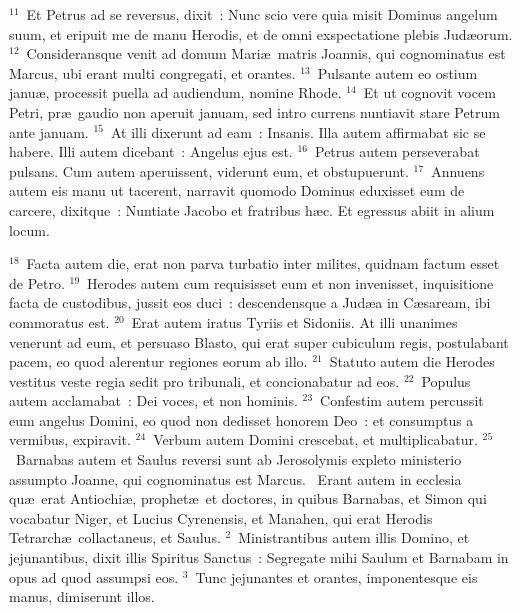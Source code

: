 ${}^{11}$~Et Petrus ad se reversus, dixit~: Nunc scio vere quia misit Dominus angelum suum, et eripuit me de manu Herodis, et de omni exspectatione plebis Jud\ae orum.
${}^{12}$~Consideransque venit ad domum Mari\ae\ matris Joannis, qui cognominatus est Marcus, ubi erant multi congregati, et orantes.
${}^{13}$~Pulsante autem eo ostium janu\ae , processit puella ad audiendum, nomine Rhode.
${}^{14}$~Et ut cognovit vocem Petri, pr\ae\ gaudio non aperuit januam, sed intro currens nuntiavit stare Petrum ante januam.
${}^{15}$~At illi dixerunt ad eam~: Insanis. Illa autem affirmabat sic se habere. Illi autem dicebant~: Angelus ejus est.
${}^{16}$~Petrus autem perseverabat pulsans. Cum autem aperuissent, viderunt eum, et obstupuerunt.
${}^{17}$~Annuens autem eis manu ut tacerent, narravit quomodo Dominus eduxisset eum de carcere, dixitque~: Nuntiate Jacobo et fratribus h\ae c. Et egressus abiit in alium locum.


${}^{18}$~Facta autem die, erat non parva turbatio inter milites, quidnam factum esset de Petro.
${}^{19}$~Herodes autem cum requisisset eum et non invenisset, inquisitione facta de custodibus, jussit eos duci~: descendensque a Jud\ae a in C\ae saream, ibi commoratus est.
${}^{20}$~Erat autem iratus Tyriis et Sidoniis. At illi unanimes venerunt ad eum, et persuaso Blasto, qui erat super cubiculum regis, postulabant pacem, eo quod alerentur regiones eorum ab illo.
${}^{21}$~Statuto autem die Herodes vestitus veste regia sedit pro tribunali, et concionabatur ad eos.
${}^{22}$~Populus autem acclamabat~: Dei voces, et non hominis.
${}^{23}$~Confestim autem percussit eum angelus Domini, eo quod non dedisset honorem Deo~: et consumptus a vermibus, expiravit.
${}^{24}$~Verbum autem Domini crescebat, et multiplicabatur.
${}^{25}$~Barnabas autem et Saulus reversi sunt ab Jerosolymis expleto ministerio assumpto Joanne, qui cognominatus est Marcus.
~Erant autem in ecclesia qu\ae\ erat Antiochi\ae , prophet\ae\ et doctores, in quibus Barnabas, et Simon qui vocabatur Niger, et Lucius Cyrenensis, et Manahen, qui erat Herodis Tetrarch\ae\ collactaneus, et Saulus.
${}^{2}$~Ministrantibus autem illis Domino, et jejunantibus, dixit illis Spiritus Sanctus~: Segregate mihi Saulum et Barnabam in opus ad quod assumpsi eos.
${}^{3}$~Tunc jejunantes et orantes, imponentesque eis manus, dimiserunt illos.



